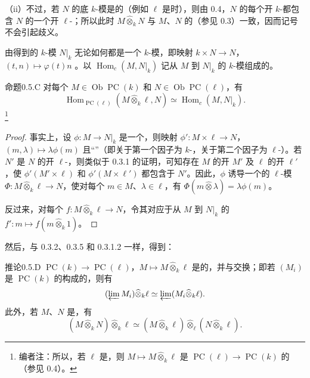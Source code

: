 （ii）不过，若 $N$ 的底 $k$-模是的（例如 $\ell$ 是时），则由 0.4，$N$ 的每个开 $k$-都包含 $N$ 的一个开 $\ell$-；所以此时 $M\widehat\otimes_k N$ 与 $M$、$N$ 的（参见 0.3）一致，因而记号不会引起歧义。

由得到的 $k$-模 $N|_k$ 无论如何都是一个 $k$-模，即映射 $k\times N\to N$，$(t,n)\mapsto\varphi(t)n$ 。以 $\operatorname{Hom}_c(M,N|_k)$ 记从 $M$ 到 $N|_k$ 的 $k$-模组成的。
\begin{SGAresult}{命题}{0.5.C}
对每个 $M\in\operatorname{Ob}\operatorname{PC}(k)$ 和 $N\in\operatorname{Ob}\operatorname{PC}(\ell)$，有
\[\operatorname{Hom}_{\operatorname{PC}(\ell)}(M\widehat\otimes_k\ell,N)\simeq\operatorname{Hom}_c(M,N|_k).\]
\footnote{编者注：所以，若 $\ell$ 是，则 $M\mapsto M\widehat\otimes_k\ell$ 是 $\operatorname{PC}(\ell)\to\operatorname{PC}(k)$ 的（参见 0.4）。}
\end{SGAresult}
\begin{proof}
事实上，设 $\phi:M\to N|_k$ 是一个，则映射 $\phi':M\times\ell\to N$，$(m,\lambda)\mapsto\lambda\phi(m)$ 且“”（即关于第一个因子为 $k$-，关于第二个因子为 $\ell$-）。若 $N'$ 是 $N$ 的开 $\ell$-，则类似于 0.3.1 的证明，可知存在 $M$ 的开 $M'$ 及 $\ell$ 的开 $\ell'$，使 $\phi'(M'\times\ell)$ 和 $\phi'(M\times\ell')$ 都包含于 $N'$。因此，$\phi$ 诱导一个的 $\ell$-模 $\Phi:M\widehat\otimes_k\ell\to N$，使对每个 $m\in M$、$\lambda\in\ell$，有 $\Phi(m\widehat\otimes\lambda)=\lambda\phi(m)$。

反过来，对每个 $f:M\widehat\otimes_k\ell\to N$，令其对应于从 $M$ 到 $N|_k$ 的 $f':m\mapsto f(m\widehat\otimes_k1)$。
\end{proof}
然后，与 0.3.2、0.3.5 和 0.3.1.2 一样，得到：
\begin{SGAresult}{推论}{0.5.D}
 $\operatorname{PC}(k)\to\operatorname{PC}(\ell)$，$M\mapsto M\widehat\otimes_k\ell$ 是的，并与交换；即若 $(M_i)$ 是 $\operatorname{PC}(k)$ 的构成的，则有
\[(\varprojlim M_i)\widehat\otimes_k\ell\simeq\varprojlim(M_i\widehat\otimes_k\ell).\]
此外，若 $M$、$N$ 是，有
\[(M\widehat\otimes_k N)\widehat\otimes_k\ell\simeq(M\widehat\otimes_k\ell)\widehat\otimes_{\ell}(N\widehat\otimes_k\ell).\]
\end{SGAresult}
